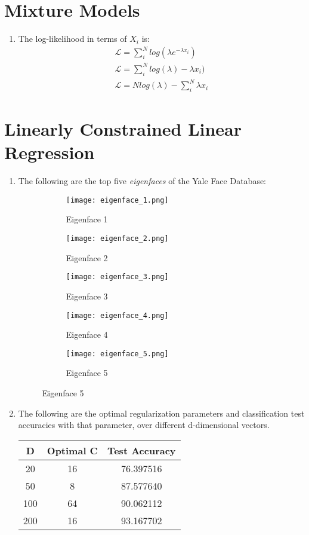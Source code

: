 \documentclass[12pt]{article}
\begin{document}
\section{Mixture Models}
\begin{enumerate}[label=\alph*.]
	\item The log-likelihood in terms of $X_i$ is:
	\begin{gather*}
		\mathcal{L} = \sum_i^N{ log( \lambda e^{- \lambda x_i})} \\
		\mathcal{L} = \sum_i^N{ log(\lambda) - \lambda x_i)} \\
		\mathcal{L} = N log(\lambda) - \sum_i^N{ \lambda x_i }
	\end{gather*}
\end{enumerate}

\section{Linearly Constrained Linear Regression}
\begin{enumerate}[label=\alph*.]
	\item The following are the top five \textit{eigenfaces} of the Yale Face Database:
	\begin{figure}[h]
	\centering
	\begin{subfigure}{.19\textwidth}
		\centering
		\texttt{[image: eigenface\_1.png]}
		\caption{Eigenface 1}
	\end{subfigure}
	\begin{subfigure}{.19\textwidth}
		\centering
		\texttt{[image: eigenface\_2.png]}
		\caption{Eigenface 2}
	\end{subfigure}
	\begin{subfigure}{.19\textwidth}
		\centering
		\texttt{[image: eigenface\_3.png]}
		\caption{Eigenface 3}
	\end{subfigure}
	\begin{subfigure}{.19\textwidth}
		\centering
		\texttt{[image: eigenface\_4.png]}
		\caption{Eigenface 4}
	\end{subfigure}
	\begin{subfigure}{.19\textwidth}
		\centering
		\texttt{[image: eigenface\_5.png]}
		\caption{Eigenface 5}
	\end{subfigure}
	\end{figure}
	
	\item The following are the optimal regularization parameters and classification test accuracies with that parameter, over different d-dimensional vectors.
	\begin{center}
		 \begin{tabular}{| c c c |} 
		 \hline
		 D & Optimal C & Test Accuracy \\
		 \hline\hline
		 20 & 16 & 76.397516 \\
		 \hline
		 50 & 8 & 87.577640 \\
		 \hline
		100 & 64 & 90.062112 \\
		 \hline
		200 & 16 & 93.167702 \\
		 \hline
		\end{tabular}
	\end{center}
\end{enumerate}
\end{document}
